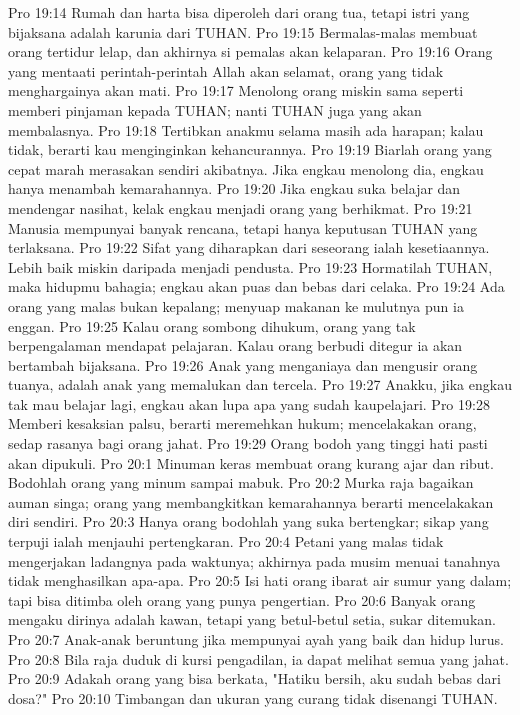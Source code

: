 Pro 19:14  Rumah dan harta bisa diperoleh dari orang tua, tetapi istri yang bijaksana adalah karunia dari TUHAN.
Pro 19:15  Bermalas-malas membuat orang tertidur lelap, dan akhirnya si pemalas akan kelaparan.
Pro 19:16  Orang yang mentaati perintah-perintah Allah akan selamat, orang yang tidak menghargainya akan mati.
Pro 19:17  Menolong orang miskin sama seperti memberi pinjaman kepada TUHAN; nanti TUHAN juga yang akan membalasnya.
Pro 19:18  Tertibkan anakmu selama masih ada harapan; kalau tidak, berarti kau menginginkan kehancurannya.
Pro 19:19  Biarlah orang yang cepat marah merasakan sendiri akibatnya. Jika engkau menolong dia, engkau hanya menambah kemarahannya.
Pro 19:20  Jika engkau suka belajar dan mendengar nasihat, kelak engkau menjadi orang yang berhikmat.
Pro 19:21  Manusia mempunyai banyak rencana, tetapi hanya keputusan TUHAN yang terlaksana.
Pro 19:22  Sifat yang diharapkan dari seseorang ialah kesetiaannya. Lebih baik miskin daripada menjadi pendusta.
Pro 19:23  Hormatilah TUHAN, maka hidupmu bahagia; engkau akan puas dan bebas dari celaka.
Pro 19:24  Ada orang yang malas bukan kepalang; menyuap makanan ke mulutnya pun ia enggan.
Pro 19:25  Kalau orang sombong dihukum, orang yang tak berpengalaman mendapat pelajaran. Kalau orang berbudi ditegur ia akan bertambah bijaksana.
Pro 19:26  Anak yang menganiaya dan mengusir orang tuanya, adalah anak yang memalukan dan tercela.
Pro 19:27  Anakku, jika engkau tak mau belajar lagi, engkau akan lupa apa yang sudah kaupelajari.
Pro 19:28  Memberi kesaksian palsu, berarti meremehkan hukum; mencelakakan orang, sedap rasanya bagi orang jahat.
Pro 19:29  Orang bodoh yang tinggi hati pasti akan dipukuli.
Pro 20:1  Minuman keras membuat orang kurang ajar dan ribut. Bodohlah orang yang minum sampai mabuk.
Pro 20:2  Murka raja bagaikan auman singa; orang yang membangkitkan kemarahannya berarti mencelakakan diri sendiri.
Pro 20:3  Hanya orang bodohlah yang suka bertengkar; sikap yang terpuji ialah menjauhi pertengkaran.
Pro 20:4  Petani yang malas tidak mengerjakan ladangnya pada waktunya; akhirnya pada musim menuai tanahnya tidak menghasilkan apa-apa.
Pro 20:5  Isi hati orang ibarat air sumur yang dalam; tapi bisa ditimba oleh orang yang punya pengertian.
Pro 20:6  Banyak orang mengaku dirinya adalah kawan, tetapi yang betul-betul setia, sukar ditemukan.
Pro 20:7  Anak-anak beruntung jika mempunyai ayah yang baik dan hidup lurus.
Pro 20:8  Bila raja duduk di kursi pengadilan, ia dapat melihat semua yang jahat.
Pro 20:9  Adakah orang yang bisa berkata, "Hatiku bersih, aku sudah bebas dari dosa?"
Pro 20:10  Timbangan dan ukuran yang curang tidak disenangi TUHAN.
